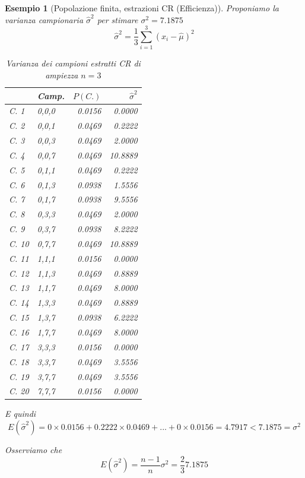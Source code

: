 \documentclass[
  11pt,
]{book}
\theoremstyle{mytheoremstyle}
\theoremstyle{mydefstyle}
\newtheorem{example}{{Esempio}}[section]
\begin{document}
\begin{example}[Popolazione finita, estrazioni CR (Efficienza)]
Proponiamo la varianza campionaria \(\hat\sigma^2\) per stimare \(\sigma^2=7.1875\)
\[\hat\sigma^2=\frac 1 3\sum_{i=1}^3(x_i-\hat \mu)^2\]

\begin{table}
\centering
\caption{\label{tab:11-Stima-4}Varianza dei campioni estratti CR di ampiezza $n=3$}
\centering
\fontsize{8}{10}\selectfont
\begin{tabular}[t]{llrr}
\toprule
  & Camp. & $P(C.)$ & $\hat\sigma^2$\\
\midrule
C. 1 & 0,0,0 & 0.0156 & 0.0000\\
C. 2 & 0,0,1 & 0.0469 & 0.2222\\
C. 3 & 0,0,3 & 0.0469 & 2.0000\\
C. 4 & 0,0,7 & 0.0469 & 10.8889\\
C. 5 & 0,1,1 & 0.0469 & 0.2222\\
\addlinespace
C. 6 & 0,1,3 & 0.0938 & 1.5556\\
C. 7 & 0,1,7 & 0.0938 & 9.5556\\
C. 8 & 0,3,3 & 0.0469 & 2.0000\\
C. 9 & 0,3,7 & 0.0938 & 8.2222\\
C. 10 & 0,7,7 & 0.0469 & 10.8889\\
\addlinespace
C. 11 & 1,1,1 & 0.0156 & 0.0000\\
C. 12 & 1,1,3 & 0.0469 & 0.8889\\
C. 13 & 1,1,7 & 0.0469 & 8.0000\\
C. 14 & 1,3,3 & 0.0469 & 0.8889\\
C. 15 & 1,3,7 & 0.0938 & 6.2222\\
\addlinespace
C. 16 & 1,7,7 & 0.0469 & 8.0000\\
C. 17 & 3,3,3 & 0.0156 & 0.0000\\
C. 18 & 3,3,7 & 0.0469 & 3.5556\\
C. 19 & 3,7,7 & 0.0469 & 3.5556\\
C. 20 & 7,7,7 & 0.0156 & 0.0000\\
\bottomrule
\end{tabular}
\end{table}

E quindi
\[
  E(\hat\sigma^2)  = 0\times0.0156+0.2222\times0.0469+...+0\times0.0156 = 4.7917<
  7.1875=\sigma^2
\]

Osserviamo che
\[
E(\hat\sigma^2)=\frac{n-1}n\sigma^2=\frac{2}{3}7.1875
\]
\end{example}
\end{document}
